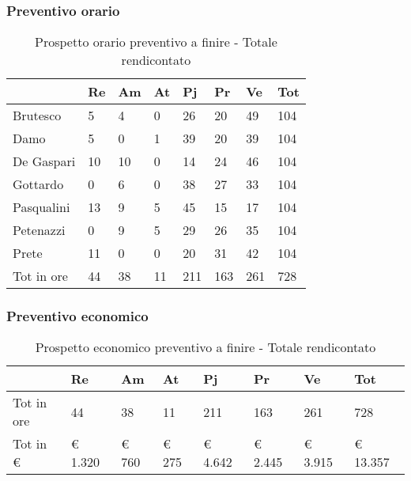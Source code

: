 		\subsubsection{Preventivo orario}
			\begin{table}[H] \begin{center} \begin{tabular}{llllllll}
									\toprule
										&	\textbf{Re}	&	\textbf{Am}	&	\textbf{At}	&	\textbf{Pj}	&	\textbf{Pr}	&	\textbf{Ve}	&	\textbf{Tot}	 \\
									\midrule
										Brutesco	&	5		&	4		&	0		&	26		&	20		&	49		&	104	\\
										Damo		&	5		&	0		&	1		&	39		&	20		&	39		&	104	\\
										De Gaspari	&	10		&	10		&	0		&	14		&	24		&	46		&	104	\\
										Gottardo	&	0		&	6		&	0		&	38		&	27		&	33		&	104	\\
										Pasqualini	&	13		&	9		&	5		&	45		&	15		&	17		&	104	\\
										Petenazzi	&	0		&	9		&	5		&	29		&	26		&	35		&	104	\\
										Prete		&	11		&	0		&	0		&	20		&	31		&	42		&	104	\\
										\midrule																					
										Tot in ore	&	44		&	38		&	11		&	211		&	163		&	261		&	728	\\
								

									\bottomrule
									\end{tabular} \end{center} \caption{Prospetto orario preventivo a finire -
									Totale rendicontato
									}\end{table}
		\subsubsection{Preventivo economico}
									\begin{table}[H] \begin{center} \begin{tabular}{llllllll}
									\toprule
										&	\textbf{Re}	&	\textbf{Am}	&	\textbf{At}	&	\textbf{Pj}	&	\textbf{Pr}	&	\textbf{Ve}	&	\textbf{Tot}	 \\

									\midrule
									Tot in ore	&	44		&	38		&	11		&	211		&	163		&	261		&	728	\\
									Tot in €	&	 € 1.320 		 & 	 € 760 		 & 	 € 275 		 & 	 € 4.642 		 & 	 € 2.445 		 & 	 € 3.915 		 & 	 € 13.357 	\\
									\bottomrule
									\end{tabular} \end{center} \caption{Prospetto economico preventivo a finire				 -
									Totale rendicontato
									}\end{table}

